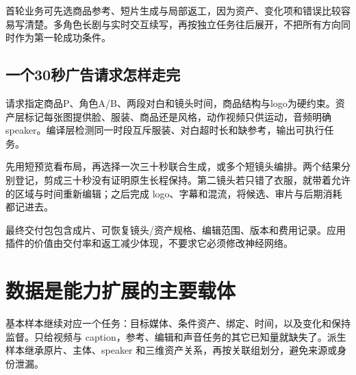 首轮业务可先选商品参考、短片生成与局部返工，因为资产、变化项和错误比较容易写清楚。多角色长剧与实时交互续写，再按独立任务往后展开，不把所有方向同时作为第一轮成功条件。

\subsection{一个30秒广告请求怎样走完}\label{seedance-m27-ux4e00ux4e2a30ux79d2ux5e7fux544aux8bf7ux6c42ux600eux6837ux8d70ux5b8c}

请求指定商品P、角色A/B、两段对白和镜头时间，商品结构与logo为硬约束。资产层标记每张图提供脸、服装、商品还是风格，动作视频只供运动，音频明确speaker。编译层检测同一时段互斥服装、对白超时长和缺参考，输出可执行任务。

先用短预览看布局，再选择一次三十秒联合生成，或多个短镜头编排。两个结果分别登记，剪成三十秒没有证明原生长程保持。第二镜头若只错了衣服，就带着允许的区域与时间重新编辑；之后完成 logo、字幕和混流，将候选、审片与后期消耗都记进去。

最终交付包包含成片、可恢复镜头/资产规格、编辑范围、版本和费用记录。应用插件的价值由交付率和返工减少体现，不要求它必须修改神经网络。

\section{数据是能力扩展的主要载体}\label{seedance-m27-ux6570ux636eux662fux80fdux529bux6269ux5c55ux7684ux4e3bux8981ux8f7dux4f53}

基本样本继续对应一个任务：目标媒体、条件资产、绑定、时间，以及变化和保持监督。只给视频与 caption，参考、编辑和声音任务的其它已知量就缺失了。派生样本继承原片、主体、speaker 和三维资产关系，再按关联组划分，避免来源或身份泄漏。

